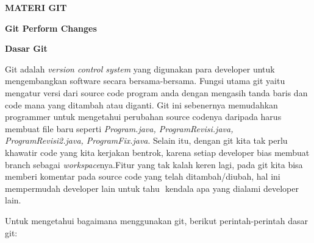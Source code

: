 
\sloppy
\begin{center}{\fontsize{16pt}{16pt}\selectfont \textbf{MATERI GIT} \\}\end{center} \par
\noindent 
\begin{center}{\fontsize{14pt}{14pt}\selectfont \textbf{Git Perform Changes} \\}\end{center} \par
\noindent 
{\fontsize{14pt}{14pt}\selectfont \textbf{Dasar Git} \\} \par
\noindent 
 \hspace*{0.5in} Git adalah $  $\textit{version control system} $  $yang digunakan para developer untuk mengembangkan software secara bersama-bersama. Fungsi utama git yaitu mengatur versi dari source code program anda dengan mengasih tanda baris dan code mana yang ditambah atau diganti. Git ini sebenernya memudahkan programmer untuk mengetahui perubahan source codenya daripada harus membuat file baru seperti $  $\textit{Program.java, ProgramRevisi.java, }\textit{ProgramRevisi2.java, ProgramFix.java}. Selain itu, dengan git kita tak perlu khawatir code yang kita kerjakan bentrok, karena setiap developer bias membuat branch sebagai $  $\textit{workspace}nya.Fitur yang tak kalah keren lagi, pada git kita bisa memberi komentar pada source code yang telah ditambah/diubah, hal ini mempermudah developer lain untuk tahu $  $ kendala apa yang dialami developer lain. \par
\vspace{12pt}
\noindent 
Untuk mengetahui bagaimana menggunakan git, berikut perintah-perintah dasar git: \par
\noindent 
